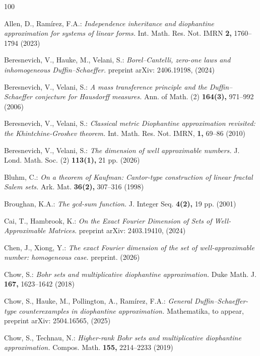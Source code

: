 \documentclass[12pt,a4paper,twoside]{article}
\begin{document}
\begin{thebibliography}{100}


Allen, D., Ram\'{i}rez, F.A.:
\textit{Independence inheritance and diophantine approximation for systems of linear forms.}
Int. Math. Res. Not. IMRN {\bf 2,} 1760--1794 (2023)



Beresnevich, V.,  Hauke, M.,  Velani, S.:
 \textit{Borel--Cantelli, zero-one laws and inhomogeneous Duffin--Schaeffer.}  preprint arXiv: 2406.19198, (2024)



 Beresnevich, V., Velani, S.:
\textit{A mass transference principle and the Duffin--Schaeffer conjecture for Hausdorff measures.}
Ann. of Math. (2) {\bf 164(3),}  971--992 (2006)


 Beresnevich, V., Velani, S.:
\textit{Classical metric Diophantine approximation revisited: the Khintchine-Groshev theorem.}
Int. Math. Res. Not. IMRN, {\bf 1,} 69--86 (2010)


Beresnevich, V., Velani, S.:
\textit{The dimension of well approximable numbers.}
J. Lond. Math. Soc. (2) {\bf 113(1),}  21 pp. (2026)


 Bluhm, C.:
\textit{On a theorem of Kaufman: Cantor-type construction of linear fractal Salem sets.}
Ark. Mat. {\bf 36(2),} 307--316 (1998)



 Broughan, K.A.:
\textit{The gcd-sum function.}
J. Integer Seq.  {\bf 4(2),}  19 pp. (2001)


Cai, T.,  Hambrook, K.:
\textit{On the Exact Fourier Dimension of Sets of Well-Approximable Matrices.}
preprint arXiv: 2403.19410,  (2024)



 Chen, J.,  Xiong, Y.:
\textit{The exact Fourier dimension of the set of well-approximable number: homogeneous case.}
 preprint. (2026)


 Chow, S.:
\textit{Bohr sets and multiplicative diophantine approximation.}
Duke Math. J. {\bf 167,}   1623--1642 (2018)


  Chow, S.,  Hauke, M.,  Pollington,  A.,   Ram\'{i}rez, F.A.:
\textit{General Duffin--Schaeffer-type counterexamples in diophantine approximation.} Mathematika, to appear,  preprint arXiv: 2504.16565, (2025)



Chow, S., Technau, N.:
\textit{Higher-rank Bohr sets and multiplicative diophantine approximation.}
Compos. Math. {\bf 155,}  2214--2233 (2019)




\end{thebibliography}
\end{document}
